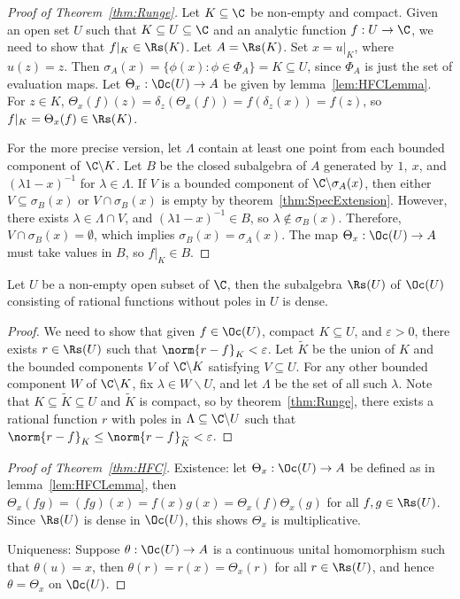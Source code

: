 \documentclass[a4paper]{article}
\begin{document}
\begin{proof}[Proof of Theorem~\ref{thm:Runge}]
  Let $K\subseteq\C$ be non-empty and compact. Given an open set $U$ such that $K\subseteq U\subseteq\C$ and an analytic function $f:U\to\C$, we need to show that $f|_K\in\Rs(K)$. Let $A=\Rs(K)$. Set $x=u|_K$, where $u(z)=z$. Then $\sigma_A(x)=\{\phi(x):\phi\in\Phi_A\}=K\subseteq U$, since $\Phi_A$ is just the set of evaluation maps. Let $\Theta_x:\Oc(U)\to A$ be given by lemma~\ref{lem:HFCLemma}. For $z\in K$, $\Theta_x(f)(z)=\delta_z(\Theta_x(f))=f(\delta_z(x))=f(z)$, so $f|_K=\Theta_x(f)\in\Rs(K)$.

  For the more precise version, let $\Lambda$ contain at least one point from each bounded component of $\C\backslash K$. Let $B$ be the closed subalgebra of $A$ generated by $1,\ x$, and $(\lambda 1-x)^{-1}$ for $\lambda\in\Lambda$. If $V$ is a bounded component of $\C\backslash\sigma_A(x)$, then either $V\subseteq\sigma_B(x)$ or $V\cap\sigma_B(x)$ is empty by theorem~\ref{thm:SpecExtension}. However, there exists $\lambda\in\Lambda\cap V$, and $(\lambda 1-x)^{-1}\in B$, so $\lambda\notin\sigma_B(x)$. Therefore, $V\cap\sigma_B(x)=\emptyset$, which implies $\sigma_B(x)=\sigma_A(x)$. The map $\Theta_x:\Oc(U)\to A$ must take values in $B$, so $f|_K\in B$.
\end{proof}

\begin{ncor}\label{cor:Runge}
  Let $U$ be a non-empty open subset of $\C$, then the subalgebra $\Rs(U)$ of $\Oc(U)$ consisting of rational functions without poles in $U$ is dense.
\end{ncor}

\begin{proof}
  We need to show that given $f\in\Oc(U)$, compact $K\subseteq U$, and $\varepsilon>0$, there exists $r\in\Rs(U)$ such that $\norm{r-f}_K<\varepsilon$. Let $\widetilde{K}$ be the union of $K$ and the bounded components $V$ of $\C\backslash K$ satisfying $V\subseteq U$. For any other bounded component $W$ of $\C\backslash K$, fix $\lambda\in W\backslash U$, and let $\Lambda$ be the set of all such $\lambda$. Note that $K\subseteq\widetilde{K}\subseteq U$ and $\widetilde{K}$ is compact, so by theorem~\ref{thm:Runge}, there exists a rational function $r$ with poles in $\Lambda\subseteq\C\backslash U$ such that $\norm{r-f}_{K}\leq\norm{r-f}_{\widetilde{K}}<\varepsilon$.
\end{proof}

\begin{proof}[Proof of Theorem~\ref{thm:HFC}]
  Existence: let $\Theta_x:\Oc(U)\to A$ be defined as in lemma~\ref{lem:HFCLemma}, then $\Theta_x(fg)=(fg)(x)=f(x)g(x)=\Theta_x(f)\Theta_x(g)$ for all $f,g\in\Rs(U)$. Since $\Rs(U)$ is dense in $\Oc(U)$, this shows $\Theta_x$ is multiplicative.

  Uniqueness: Suppose $\theta:\Oc(U)\to A$ is a continuous unital homomorphism such that $\theta(u)=x$, then $\theta(r)=r(x)=\Theta_x(r)$ for all $r\in\Rs(U)$, and hence $\theta=\Theta_x$ on $\Oc(U)$.
\end{proof}
\end{document}
